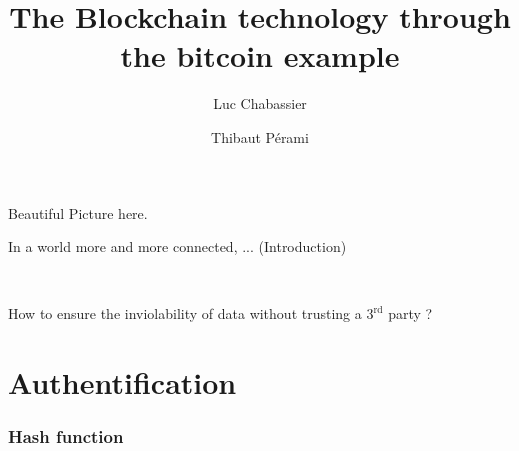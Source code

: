 \documentclass[12pt]{beamer}
\title{The Blockchain technology through the bitcoin example}
\author{Luc Chabassier \and Thibaut Pérami}
\institute{École Normale Supérieure}
\begin{document}
\begin{frame}
Beautiful Picture here. %
\end{frame}

\begin{frame}
    \maketitle
\end{frame}

\begin{frame}
In a world more and more connected, ... (Introduction) %

\

How to ensure the inviolability of data without trusting a $3^{\mathrm {rd}}$ party ?

\end{frame}

\begin{frame}

\tableofcontents

\end{frame}

\section{Authentification}

\begin{frame}
    \frametitle{Hash function}
\end{frame}
\end{document}
